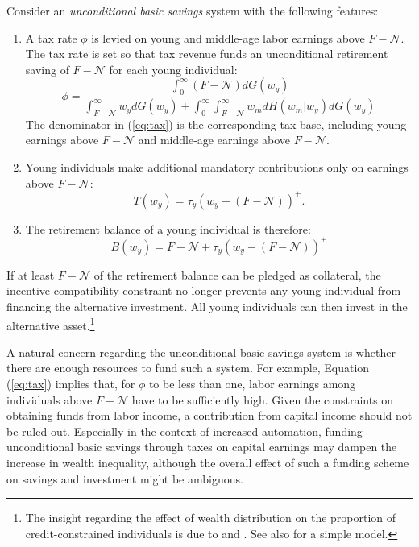 \documentclass[draft,pdftex,nolinenumbers,noinfoline]{article}
\theoremstyle{plain}
\begin{document}
Consider an \textit{unconditional basic savings} system with the following features:
\begin{enumerate}
    \item A tax rate $\phi$ is levied on young and middle-age labor earnings above $F-\mathcal{N}$. The tax rate is set so that tax revenue funds an unconditional retirement saving of $F-\mathcal{N}$ for each young individual:
    \begin{equation}\label{eq:tax}
        \phi = \frac{\int_0^\infty\left(F-\mathcal{N}\right)dG(w_y)}{\int_{F-\mathcal{N}}^\infty w_ydG(w_y) + \int_{0}^\infty\int_{F-\mathcal{N}}^\infty w_mdH(w_m|w_y)dG(w_y)}
    \end{equation}
    The denominator in (\ref{eq:tax}) is the corresponding tax base, including young earnings above $F-\mathcal{N}$ and middle-age earnings above $F-\mathcal{N}$.
    \item Young individuals make additional mandatory contributions only on earnings above $F-\mathcal{N}$:
    \begin{equation}\label{eq:T}
        T(w_y) = \tau_y\left(w_y - \left( F-\mathcal{N}\right)\right)^+.
    \end{equation} 
    \item The retirement balance of a young individual is therefore:
    \begin{equation}\label{eq:B}
    B(w_y) =  F-\mathcal{N}  + \tau_y\left(w_y - \left( F-\mathcal{N}\right)\right)^+
    \end{equation}
\end{enumerate}
If at least $F-\mathcal{N}$ of the retirement balance can be pledged as collateral, the incentive-compatibility constraint no longer prevents any young individual from financing the alternative investment. All young individuals can then invest in the alternative asset.\footnote{The insight regarding the effect of wealth distribution on the proportion of credit-constrained individuals is due to  \cite{Galor1993} and \cite{Banerjee1993}. See also \cite{Ghatak2002} for a simple model.}

A natural concern regarding the unconditional basic savings system is whether there are enough resources to fund such a system. For example, Equation (\ref{eq:tax}) implies that, for $\phi$ to be less than one, labor earnings among individuals above $F-\mathcal{N}$ have to be sufficiently high. Given the constraints on obtaining funds from labor income, a contribution from capital income should not be ruled out. Especially in the context of increased automation, funding unconditional basic savings through taxes on capital earnings may dampen the increase in wealth inequality, although the overall effect of such a funding scheme on savings and investment might be ambiguous.
\end{document}
